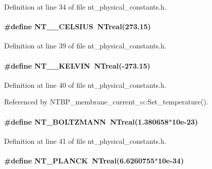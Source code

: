 Definition at line 34 of file nt\_\-physical\_\-constants.h.

\paragraph[{NT\_\-0\_\-CELSIUS}]{\setlength{\rightskip}{0pt plus 5cm}\#define NT\_\_\-CELSIUS~{\bf NTreal}(273.15)}\hfill\label{nt__physical__constants_8h_a8b4ddb21167b8f846bf05006640d8e58}


Definition at line 39 of file nt\_\-physical\_\-constants.h.

\paragraph[{NT\_\-0\_\-KELVIN}]{\setlength{\rightskip}{0pt plus 5cm}\#define NT\_\_\-KELVIN~{\bf NTreal}(-\/273.15)}\hfill\label{nt__physical__constants_8h_ae95e2529f943f729e9db23340a3fba07}


Definition at line 40 of file nt\_\-physical\_\-constants.h.



Referenced by NTBP\_\-membrane\_\-current\_\-o::Set\_\-temperature().

\paragraph[{NT\_\-BOLTZMANN}]{\setlength{\rightskip}{0pt plus 5cm}\#define NT\_\-BOLTZMANN~{\bf NTreal}(1.380658$\ast$10e-\/23)}\hfill\label{nt__physical__constants_8h_abe64d4124212752c40dd8c96ba43cdfd}


Definition at line 41 of file nt\_\-physical\_\-constants.h.

\paragraph[{NT\_\-PLANCK}]{\setlength{\rightskip}{0pt plus 5cm}\#define NT\_\-PLANCK~{\bf NTreal}(6.6260755$\ast$10e-\/34)}\hfill\label{nt__physical__constants_8h_a6310537ab525b43c6e3771c88afe1036}


